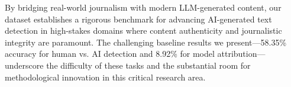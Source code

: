 By bridging real-world journalism with modern LLM-generated content, our dataset establishes a rigorous benchmark for advancing AI-generated text detection in high-stakes domains where content authenticity and journalistic integrity are paramount. The challenging baseline results we present---58.35\% accuracy for human vs. AI detection and 8.92\% for model attribution---underscore the difficulty of these tasks and the substantial room for methodological innovation in this critical research area.
